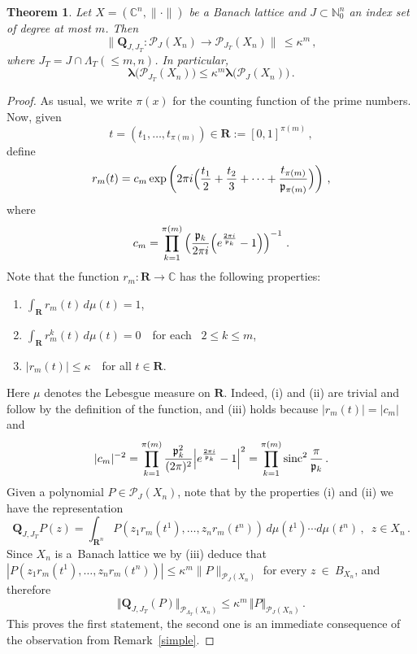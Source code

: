 \documentclass[12pt]{amsart}
\numberwithin{subsection}{section}
\newtheorem{theorem}{Theorem}[section]
\theoremstyle{definition}
\theoremstyle{remark}
\newcommand{\CC}{\mathbb C}
\newcommand{\sinc}{\operatorname{sinc}}
\begin{document}
\begin{theorem}\label{OrOuSe}
Let $X = (\CC^n, \| \cdot \|)$ be a Banach lattice  and  $J \subset \mathbb{N}_0^n$ an  index set of degree at most $m$. Then
\[
\big\|\mathbf{Q}_{J,J_T}\colon \mathcal{P}_J(X_n) \to \mathcal{P}_{J_T}(X_n)\big\|\,
\leq \kappa^m\,,
\]
where $J_T = J \cap \Lambda_T(\le\! m,n)$. In particular,
\[
\boldsymbol{\lambda}\big(\mathcal{P}_{J_T }(X_n)\big) \leq \kappa^m \boldsymbol{\lambda}\big(\mathcal{P}_J(X_n)\big)\,.
\]
\end{theorem}

\begin{proof}

As usual, we write $\pi(x)$ for the counting function of the prime numbers. Now, given
\[
t=(t_1,\ldots,t_{\pi(m)}) \in  \pmb{R} :=[0,1]^{\pi(m)}\,,
\]
define
\[
r_m(t)=c_m \exp \left(2\pi i\Bigl(\frac {t_1}2 + \frac {t_2}3+\cdots+ \frac
{t_{\pi(m)}}{\mathfrak{p}_{\pi(m)}}\Bigr)\right)\,,
\]
where
\[
c_m=\prod_{k=1}^{\pi(m)} \left(\frac {\mathfrak{p}_k}{2\pi i}
\Bigl(e^{\frac {2\pi i}{\mathfrak p_k}} -1\Bigr)\right)^{-1}\,.
\]
Note that the function $r_m:\pmb{R}\to \mathbb{C}$ has the following properties:
\begin{enumerate}
\item[(i)] $\int_{\pmb{R}} r_m(t)\,d\mu(t)=1$,
\item[(ii)] $\int_{\pmb{R}} r_m^k(t)\, d\mu(t)=0$\ \ for each \, $2 \leq k \leq m$,
\item[(iii)] $|r_m(t)|\le \kappa$\ \ for all $t \in \pmb{R}$.
\end{enumerate}
Here $\mu$ denotes the  Lebesgue measure on $\pmb{R}$. Indeed, (i) and (ii) are trivial and follow by the definition
of the function, and (iii) holds because $|r_m(t)| = |c_m|$ and
\[
|c_m|^{-2}= \prod_{k=1}^{\pi(m)} \frac{\mathfrak{p}_k^2}{(2\pi)^2} \Bigl|e^{\frac{2\pi i}{\mathfrak{p}_k}}-1\Bigr|^2
 = \prod_{k=1}^{\pi(m)} \sinc^2\frac{\pi}{\mathfrak{p}_k}\,.
\]
Given a polynomial $P \in \mathcal P_J(X_n)$, note that by the properties (i) and (ii) we have the representation
\[
\mathbf{Q}_{J,J_T}P(z)=\int_{\pmb{R}^n} P(z_1r_m(t^1),\ldots, z_n r_m(t^n))\,
d\mu(t^1)\cdots d\mu(t^n)\,,\,\,\, z \in X_n\,.
\]
Since $X_n$ is a~Banach lattice we by (iii) deduce that  $|P(z_1 r_m(t^1),\ldots, z_n r_m(t^n))|
\le \kappa^m \|P\|_{\mathcal{P}_{J}(X_n)}$ for every $z~\in~B_{X_n}$, and therefore
\[
\Vert \mathbf{Q}_{J,J_T}(P) \Vert_{\mathcal{P}_{\Lambda_T}(X_n)} \leq \kappa^m \,\Vert P \Vert_{\mathcal{P}_{J}(X_n)}\,.
\]
This proves the first statement, the second one is an immediate consequence of the observation from Remark~\ref{simple}.
\end{proof}
\end{document}
